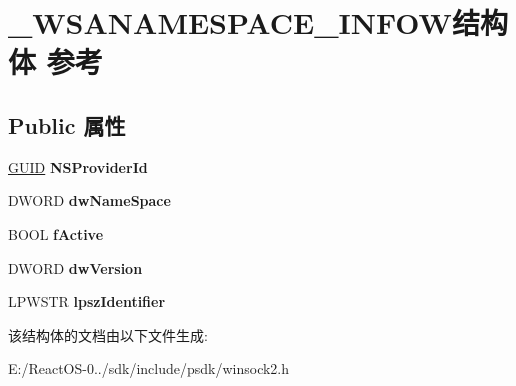 \hypertarget{struct___w_s_a_n_a_m_e_s_p_a_c_e___i_n_f_o_w}{}\section{\+\_\+\+W\+S\+A\+N\+A\+M\+E\+S\+P\+A\+C\+E\+\_\+\+I\+N\+F\+O\+W结构体 参考}
\label{struct___w_s_a_n_a_m_e_s_p_a_c_e___i_n_f_o_w}
\subsection*{Public 属性}
\begin{DoxyCompactItemize}
\item 
\mbox{\label{struct___w_s_a_n_a_m_e_s_p_a_c_e___i_n_f_o_w_aec9067e0b118a8bd343b6cc540025d31}} 
\hyperlink{interface_g_u_i_d}{G\+U\+ID} {\bfseries N\+S\+Provider\+Id}
\item 
\mbox{\label{struct___w_s_a_n_a_m_e_s_p_a_c_e___i_n_f_o_w_a0554b823a20732c7dbd85e28a65b0a33}} 
D\+W\+O\+RD {\bfseries dw\+Name\+Space}
\item 
\mbox{\label{struct___w_s_a_n_a_m_e_s_p_a_c_e___i_n_f_o_w_aa6f2ddfd3f0b21207505ead8be374630}} 
B\+O\+OL {\bfseries f\+Active}
\item 
\mbox{\label{struct___w_s_a_n_a_m_e_s_p_a_c_e___i_n_f_o_w_acbbe483a6849de688f4d6839e2cf14d1}} 
D\+W\+O\+RD {\bfseries dw\+Version}
\item 
\mbox{\label{struct___w_s_a_n_a_m_e_s_p_a_c_e___i_n_f_o_w_a2f9d20d86f32cde2cf3e581ce0f16435}} 
L\+P\+W\+S\+TR {\bfseries lpsz\+Identifier}
\end{DoxyCompactItemize}


该结构体的文档由以下文件生成\+:\begin{DoxyCompactItemize}
\item 
E\+:/\+React\+O\+S-\/0../sdk/include/psdk/winsock2.\+h\end{DoxyCompactItemize}
